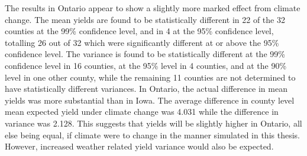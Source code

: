 The results in Ontario appear to show a slightly more marked effect from climate change. The mean yields are found to be statistically different in 22 of the 32 counties at the 99\% confidence level, and in 4 at the 95\% confidence level, totalling 26 out of 32 which were significantly different at or above the 95\% confidence level. The variance is found to be statistically different at the 99\% confidence level in 16 counties, at the 95\% level in 4 counties, and at the 90\% level in one other county, while the remaining 11 counties are not determined to have statistically different variances. In Ontario, the actual difference in mean yields was more substantial than in Iowa. The average difference in county level mean expected yield under climate change was 4.031 while the difference in variance was 2.128. This suggests that yields will be slightly higher in Ontario, all else being equal, if climate were to change in the manner simulated in this thesis. However, increased weather related yield variance would also be expected. 